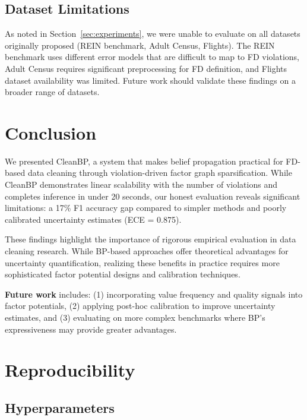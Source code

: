 \documentclass{article}
\begin{document}
\subsection{Dataset Limitations}

As noted in Section~\ref{sec:experiments}, we were unable to evaluate on all datasets originally proposed (REIN benchmark, Adult Census, Flights). The REIN benchmark uses different error models that are difficult to map to FD violations, Adult Census requires significant preprocessing for FD definition, and Flights dataset availability was limited. Future work should validate these findings on a broader range of datasets.

\section{Conclusion}
\label{sec:conclusion}

We presented CleanBP, a system that makes belief propagation practical for FD-based data cleaning through violation-driven factor graph sparsification. While CleanBP demonstrates linear scalability with the number of violations and completes inference in under 20 seconds, our honest evaluation reveals significant limitations: a 17\% F1 accuracy gap compared to simpler methods and poorly calibrated uncertainty estimates (ECE = 0.875).

These findings highlight the importance of rigorous empirical evaluation in data cleaning research. While BP-based approaches offer theoretical advantages for uncertainty quantification, realizing these benefits in practice requires more sophisticated factor potential designs and calibration techniques.

\textbf{Future work} includes: (1) incorporating value frequency and quality signals into factor potentials, (2) applying post-hoc calibration to improve uncertainty estimates, and (3) evaluating on more complex benchmarks where BP's expressiveness may provide greater advantages.




\newpage
\appendix

\section{Reproducibility}
\label{app:reproducibility}

\subsection{Hyperparameters}
\end{document}
